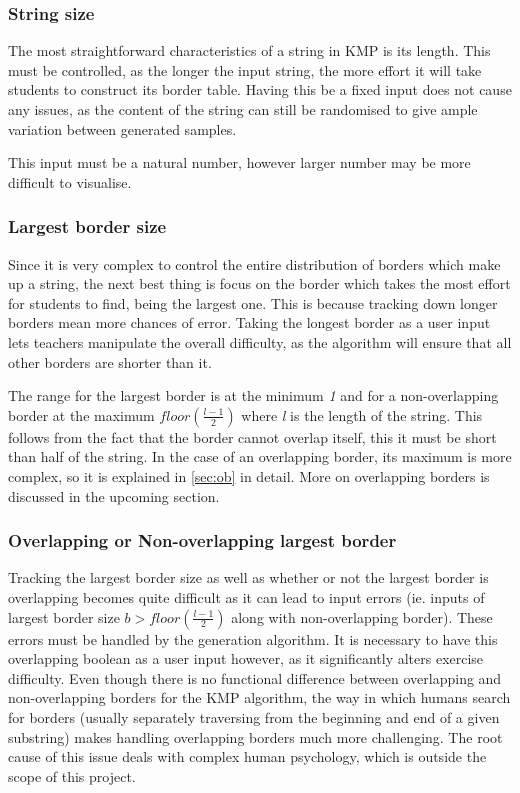 \documentclass{l4proj}
\begin{document}
\subsubsection{String size}

The most straightforward characteristics of a string in KMP is its length. This must be controlled, as the longer the input string, the more effort it will take students to construct its border table. Having this be a fixed input does not cause any issues, as the content of the string can still be randomised to give ample variation between generated samples.

This input must be a natural number, however larger number may be more difficult to visualise.

\subsubsection{Largest border size}

Since it is very complex to control the entire distribution of borders which make up a string, the next best thing is focus on the border which takes the most effort for students to find, being the largest one. This is because tracking down longer borders mean more chances of error. Taking the longest border as a user input lets teachers manipulate the overall difficulty, as the algorithm will ensure that all other borders are shorter than it.

The range for the largest border is at the minimum \emph{1} and for a non-overlapping border at the maximum $floor(\frac{l-1}{2})$ where \emph{l} is the length of the string. This follows from the fact that the border cannot overlap itself, this it must be short than half of the string. In the case of an overlapping border, its maximum is more complex, so it is explained in \autoref{sec:ob} in detail. More on overlapping borders is discussed in the upcoming section.

\subsubsection{Overlapping or Non-overlapping largest border}

Tracking the largest border size as well as whether or not the largest border is overlapping becomes quite difficult as it can lead to input errors (ie. inputs of largest border size $b > floor(\frac{l-1}{2})$ along with non-overlapping border). These errors must be handled by the generation algorithm. It is necessary to have this overlapping boolean as a user input however, as it significantly alters exercise difficulty. Even though there is no functional difference between overlapping and non-overlapping borders for the KMP algorithm, the way in which humans search for borders (usually separately traversing from the beginning and end of a given substring) makes handling overlapping borders much more challenging. The root cause of this issue deals with complex human psychology, which is outside the scope of this project. \cite{a}
\end{document}
